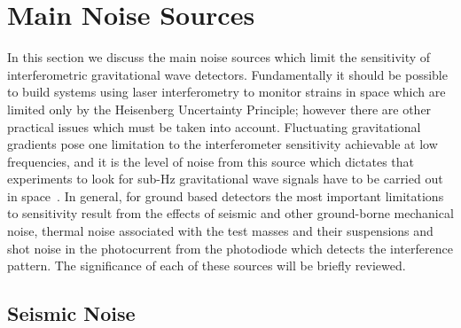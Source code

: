 \documentclass{article}
\begin{document}

\newpage

\section{Main Noise Sources}
\label{section:noise}

In this section we discuss the main noise sources which limit the
sensitivity of interferometric gravitational wave
detectors. Fundamentally it should be possible to build systems using
laser interferometry to monitor strains in space which are limited
only by the Heisenberg Uncertainty Principle; however there are other
practical issues which must be taken into account. Fluctuating
gravitational gradients pose one limitation to the interferometer
sensitivity achievable at low frequencies, and it is the level of
noise from this source which dictates that experiments to look for
sub-Hz gravitational wave signals have to be carried out in
space~\cite{Spero, Saulson1, Beccaria, Hughes}. In general, for ground
based detectors the most important limitations to sensitivity result
from the effects of seismic and other ground-borne mechanical noise,
thermal noise associated with the test masses and their suspensions
and shot noise in the photocurrent from the photodiode which detects
the interference pattern. The significance of each of these sources
will be briefly reviewed.




\subsection{Seismic Noise}
\label{subsection:seismic}
\end{document}
